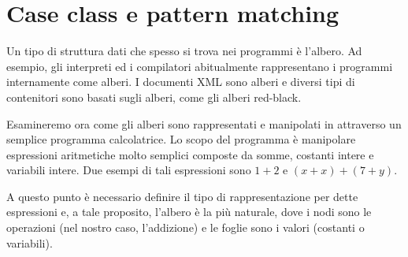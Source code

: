 \section{Case class e pattern matching}
\label{sec:case-classes-pattern}

Un tipo di struttura dati che spesso si trova nei programmi \`e l'albero. Ad esempio, gli interpreti ed i compilatori abitualmente rappresentano i programmi internamente come alberi. I documenti XML sono alberi e diversi tipi di contenitori sono basati sugli alberi, come gli alberi red-black.

Esamineremo ora come gli alberi sono rappresentati e manipolati in \Scala attraverso un semplice programma calcolatrice. Lo scopo del programma \`e manipolare espressioni aritmetiche molto semplici composte da somme, costanti intere e variabili intere. Due esempi di tali espressioni sono $1+2$ e $(x+x)+(7+y)$.

A questo punto \`e necessario definire il tipo di rappresentazione per dette espressioni e, a tale proposito, l'albero \`e la pi\`u naturale, dove i nodi sono le operazioni (nel nostro caso, l'addizione) e le foglie sono i valori (costanti o variabili).

